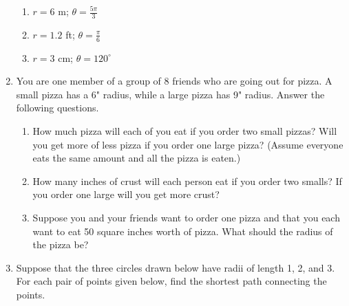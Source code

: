 \begin{enumerate}
\begin{enumerate}
\item $r=6$ m; $\theta=\frac{5\pi}{3}$\vfill
\item $r=1.2$ ft; $\theta=\frac{\pi}{6}$\vfill
\item $r=3$ cm; $\theta=120^\circ $\vfill

\end{enumerate}


\newpage

\item You are one member of a group of 8 friends who are going out for pizza.  A small pizza has a 6" radius, while a large pizza has 9"  radius.  Answer the following questions.
\begin{enumerate}
	\item How much pizza will each of you eat if you order two small pizzas?  Will you get more of less pizza if you order one large pizza? (Assume everyone eats the same amount and all the pizza is eaten.)
	\vfill
	\item How many inches of crust will each person eat if you order two smalls?  If you order one large will you get more crust?
	\vfill
	\item Suppose you and your friends want to order one pizza and that you each want to eat 50 square inches worth of pizza.  What should the radius of the pizza be?
	\vfill
\end{enumerate}

\newpage

\item Suppose that the three circles drawn below have radii of length 1, 2, and 3.  For each pair of points given below, find the shortest path connecting the points.
\begin{center}
\end{center}




\end{enumerate}
